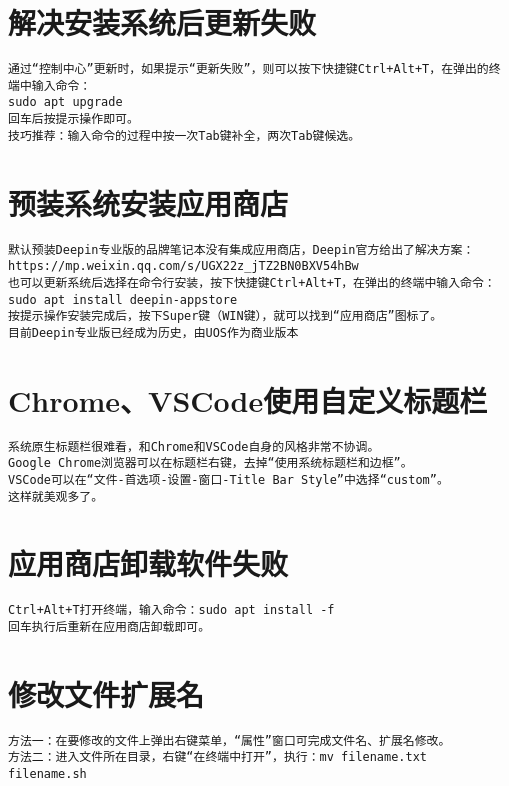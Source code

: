 \documentclass[a4paper,fontset=fandol,zihao=-4,linespread=1.2,oneside]{ctexbook}
\begin{document}
\section{解决安装系统后更新失败}
\begin{lstlisting}
通过“控制中心”更新时，如果提示“更新失败”，则可以按下快捷键Ctrl+Alt+T，在弹出的终端中输入命令：
sudo apt upgrade
回车后按提示操作即可。
技巧推荐：输入命令的过程中按一次Tab键补全，两次Tab键候选。
\end{lstlisting}

\section{预装系统安装应用商店}
\begin{lstlisting}
默认预装Deepin专业版的品牌笔记本没有集成应用商店，Deepin官方给出了解决方案：
https://mp.weixin.qq.com/s/UGX22z_jTZ2BN0BXV54hBw
也可以更新系统后选择在命令行安装，按下快捷键Ctrl+Alt+T，在弹出的终端中输入命令：
sudo apt install deepin-appstore
按提示操作安装完成后，按下Super键（WIN键），就可以找到“应用商店”图标了。
目前Deepin专业版已经成为历史，由UOS作为商业版本
\end{lstlisting}

\section{Chrome、VSCode使用自定义标题栏}
\begin{lstlisting}
系统原生标题栏很难看，和Chrome和VSCode自身的风格非常不协调。
Google Chrome浏览器可以在标题栏右键，去掉“使用系统标题栏和边框”。
VSCode可以在“文件-首选项-设置-窗口-Title Bar Style”中选择“custom”。
这样就美观多了。
\end{lstlisting}

\section{应用商店卸载软件失败}
\begin{lstlisting}
Ctrl+Alt+T打开终端，输入命令：sudo apt install -f
回车执行后重新在应用商店卸载即可。
\end{lstlisting}

\section{修改文件扩展名}
\begin{lstlisting}
方法一：在要修改的文件上弹出右键菜单，“属性”窗口可完成文件名、扩展名修改。
方法二：进入文件所在目录，右键“在终端中打开”，执行：mv filename.txt filename.sh
\end{lstlisting}
\end{document}
